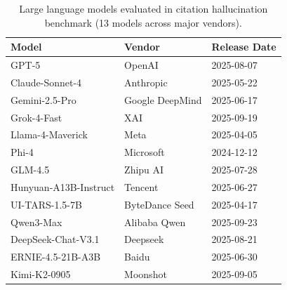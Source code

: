 \begin{table}[t]
\centering
\caption{Large language models evaluated in citation hallucination benchmark (13 models across major vendors).}
\label{tab:models_evaluated}
\small
{}
\begin{tabular}{lll}
\toprule
\textbf{Model} & \textbf{Vendor} & \textbf{Release Date} \\
\midrule
GPT-5 & OpenAI & 2025-08-07 \\
Claude-Sonnet-4 & Anthropic & 2025-05-22 \\
Gemini-2.5-Pro & Google DeepMind & 2025-06-17 \\
Grok-4-Fast & XAI & 2025-09-19 \\
Llama-4-Maverick & Meta & 2025-04-05 \\
Phi-4 & Microsoft & 2024-12-12 \\
GLM-4.5 & Zhipu AI & 2025-07-28 \\
Hunyuan-A13B-Instruct & Tencent & 2025-06-27 \\
UI-TARS-1.5-7B & ByteDance Seed & 2025-04-17 \\
Qwen3-Max & Alibaba Qwen & 2025-09-23 \\
DeepSeek-Chat-V3.1 & Deepseek & 2025-08-21 \\
ERNIE-4.5-21B-A3B & Baidu & 2025-06-30 \\
Kimi-K2-0905 & Moonshot & 2025-09-05 \\
\bottomrule
\end{tabular}
\end{table}

